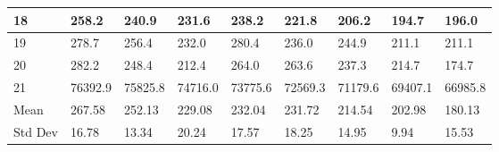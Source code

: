 \documentclass{article}
\begin{document}
\begin{table}[!htbp]
{\begin{tabular}{ |p{3cm}|| p{3cm} | p{3cm} | p{3cm} | p{3cm} | p{3cm} | p{3cm} | p{3cm} | p{3cm}| }
\hline
 18 & 258.2 & 240.9 & 231.6 & 238.2 & 221.8 & 206.2 & 194.7 & 196.0 \\ 
\hline
 19 & 278.7 & 256.4 & 232.0 & 280.4 & 236.0 & 244.9 & 211.1 & 211.1 \\ 
\hline
 20 & 282.2 & 248.4 & 212.4 & 264.0 & 263.6 & 237.3 & 214.7 & 174.7 \\ 
\hline
 21 & 76392.9 & 75825.8 & 74716.0 & 73775.6 & 72569.3 & 71179.6 & 69407.1 & 66985.8 \\ 
\hline
Mean & 267.58 & 252.13 & 229.08 & 232.04 & 231.72 & 214.54 & 202.98 & 180.13 \\ 
\hline
Std Dev & 16.78 & 13.34 & 20.24 & 17.57 & 18.25 & 14.95 & 9.94 & 15.53 \\ 
\hline
\end{tabular}%
}
\end{table}
\newpage
\end{document}
